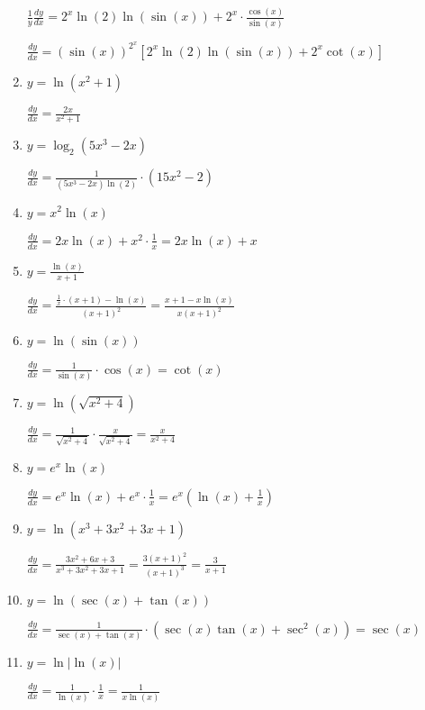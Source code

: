 \documentclass{article}
\begin{document}
\begin{enumerate}
    $\frac{1}{y} \frac{dy}{dx} = 2^x \ln(2) \ln(\sin(x)) + 2^x \cdot \frac{\cos(x)}{\sin(x)}$

    $\frac{dy}{dx} = (\sin(x))^{2^x} \left[ 2^x \ln(2) \ln(\sin(x)) + 2^x \cot(x) \right]$


\item $y = \ln(x^2 + 1)$

    $\frac{dy}{dx} = \frac{2x}{x^2 + 1}$

\item $y = \log_2(5x^3 - 2x)$

    $\frac{dy}{dx} = \frac{1}{(5x^3 - 2x) \ln(2)} \cdot (15x^2 - 2)$

\item $y = x^2 \ln(x)$

    $\frac{dy}{dx} = 2x \ln(x) + x^2 \cdot \frac{1}{x} = 2x \ln(x) + x$

\item $y = \frac{\ln(x)}{x + 1}$

    $\frac{dy}{dx} = \frac{\frac{1}{x} \cdot (x+1) - \ln(x)}{(x+1)^2} = \frac{x + 1 - x \ln(x)}{x(x+1)^2}$

\item $y = \ln(\sin(x))$

    $\frac{dy}{dx} = \frac{1}{\sin(x)} \cdot \cos(x) = \cot(x)$

\item $y = \ln(\sqrt{x^2 + 4})$

    $\frac{dy}{dx} = \frac{1}{\sqrt{x^2 + 4}} \cdot \frac{x}{\sqrt{x^2 + 4}} = \frac{x}{x^2 + 4}$

\item $y = e^x \ln(x)$

    $\frac{dy}{dx} = e^x \ln(x) + e^x \cdot \frac{1}{x} = e^x \left( \ln(x) + \frac{1}{x} \right)$

\item $y = \ln(x^3 + 3x^2 + 3x + 1)$ 

    $\frac{dy}{dx} = \frac{3x^2 + 6x + 3}{x^3 + 3x^2 + 3x + 1} = \frac{3(x+1)^2}{(x+1)^3} = \frac{3}{x+1}$

\item $y = \ln(\sec(x) + \tan(x))$

    $\frac{dy}{dx} = \frac{1}{\sec(x) + \tan(x)} \cdot (\sec(x) \tan(x) + \sec^2(x)) = \sec(x)$

\item $y = \ln|\ln(x)|$

    $\frac{dy}{dx} = \frac{1}{\ln(x)} \cdot \frac{1}{x} = \frac{1}{x \ln(x)}$


\end{enumerate}
\end{document}
